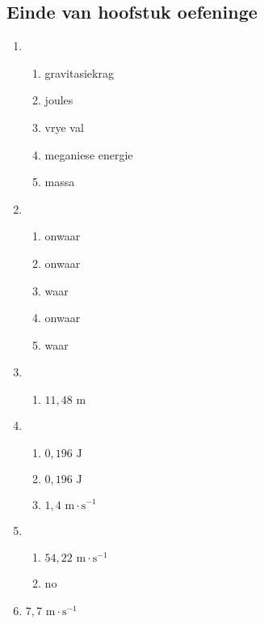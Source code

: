 \subsection{Einde van hoofstuk oefeninge}
\begin{multicols}{3}
 \begin{enumerate}[noitemsep, label=\textbf{(\arabic*)} ]
  \item 
\begin{enumerate}[noitemsep, label=\textbf{(\alph*)} ]
 \item gravitasiekrag
\item joules
\item vrye val
\item meganiese energie
\item massa
\end{enumerate}
\item 
\begin{enumerate}[noitemsep, label=\textbf{(\alph*)} ]
 \item onwaar
\item onwaar
\item waar
\item onwaar
\item waar
\end{enumerate}
\item 
\begin{enumerate}[noitemsep, label=\textbf{(\alph*)} ]
 \item $11,48 \text{ m}$
\end{enumerate}
\item 
\begin{enumerate}[noitemsep, label=\textbf{(\alph*)} ]
 \item $0,196 \text{ J}$
\item $0,196 \text{ J}$
\item $1,4 \text{ m}\cdot \text{s}^{-1}$
\end{enumerate}
\item 
\begin{enumerate}[noitemsep, label=\textbf{(\alph*)} ]
 \item $54,22 \text{ m}\cdot \text{s}^{-1}$
\item no
\end{enumerate}
\item $7,7 \text{ m}\cdot \text{s}^{-1}$
 \end{enumerate}
\end{multicols}
